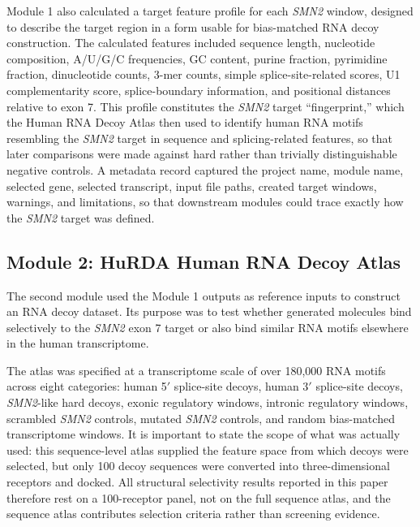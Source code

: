 \documentclass[journal]{IEEEtran}
\begin{document}
Module 1 also calculated a target feature profile for each
\textit{SMN2} window, designed to describe the target region in a form
usable for bias-matched RNA decoy construction. The calculated features
included sequence length, nucleotide composition, A/U/G/C frequencies,
GC content, purine fraction, pyrimidine fraction, dinucleotide counts,
3-mer counts, simple splice-site-related scores, U1 complementarity
score, splice-boundary information, and positional distances relative to
exon 7. This profile constitutes the \textit{SMN2} target
``fingerprint,'' which the Human RNA Decoy Atlas then used to identify
human RNA motifs resembling the \textit{SMN2} target in sequence and
splicing-related features, so that later comparisons were made against
hard rather than trivially distinguishable negative controls. A metadata
record captured the project name, module name, selected gene, selected
transcript, input file paths, created target windows, warnings, and
limitations, so that downstream modules could trace exactly how the
\textit{SMN2} target was defined.

\subsection{Module 2: HuRDA Human RNA Decoy Atlas}
\label{sec:hurda}

The second module used the Module 1 outputs as reference inputs to
construct an RNA decoy dataset. Its purpose was to test whether
generated molecules bind selectively to the \textit{SMN2} exon 7 target
or also bind similar RNA motifs elsewhere in the human transcriptome.

The atlas was specified at a transcriptome scale of over 180{,}000 RNA
motifs across eight categories: human 5$'$ splice-site decoys, human
3$'$ splice-site decoys, \textit{SMN2}-like hard decoys, exonic
regulatory windows, intronic regulatory windows, scrambled
\textit{SMN2} controls, mutated \textit{SMN2} controls, and random
bias-matched transcriptome windows. It is important to state the scope
of what was actually used: this sequence-level atlas supplied the
feature space from which decoys were selected, but only 100 decoy
sequences were converted into three-dimensional receptors and docked.
All structural selectivity results reported in this paper therefore rest
on a 100-receptor panel, not on the full sequence atlas, and the
sequence atlas contributes selection criteria rather than screening
evidence.
\end{document}
